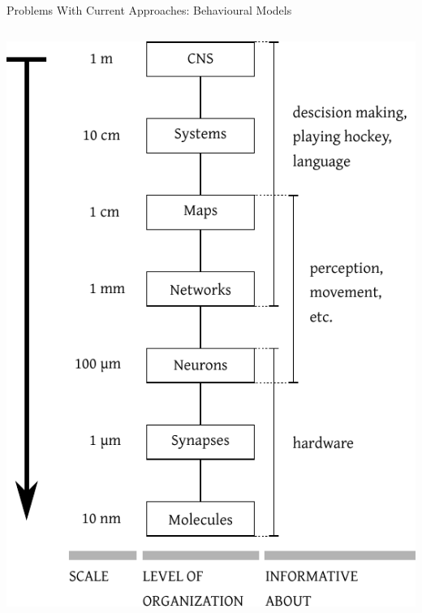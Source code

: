 \documentclass[handout,aspectratio=169]{beamer}
\begin{document}
\begin{frame}{Problems With Current Approaches: Behavioural Models}
\begin{columns}[c]
		\includegraphics[width=\textwidth]{media/levels_direction_top_down.pdf}
	\end{columns}
\end{frame}
\end{document}
